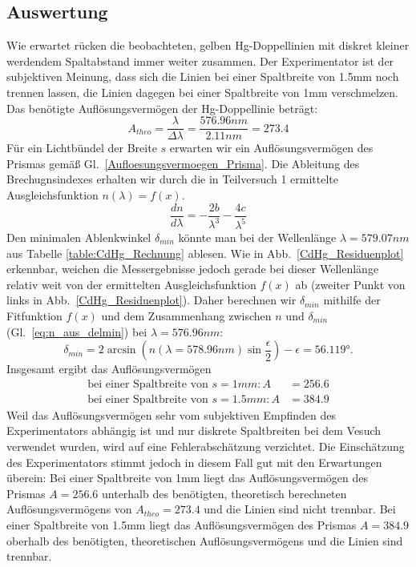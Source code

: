 \documentclass[12pt,a4paper]{article}
\begin{document}
\subsection{Auswertung}
Wie erwartet rücken die beobachteten, gelben Hg-Doppellinien mit diskret kleiner werdendem Spaltabstand immer weiter zusammen. Der Experimentator ist der subjektiven Meinung, dass sich die Linien bei einer Spaltbreite von 1.5mm noch trennen lassen, die Linien dagegen bei einer Spaltbreite von 1mm verschmelzen.\\
Das benötigte Auflösungsvermögen der Hg-Doppellinie beträgt:
\begin{equation}
A_{theo}=\frac{\lambda}{\Delta\lambda}=\frac{576.96nm}{2.11nm}=273.4
\end{equation}
Für ein Lichtbündel der Breite $s$ erwarten wir ein Auflösungsvermögen des Prismas gemäß Gl.~\ref{Aufloesungsvermoegen_Prisma}. Die Ableitung des Brechugnsindexes erhalten wir durch die in Teilversuch 1 ermittelte Ausgleichsfunktion $n(\lambda)=f(x)$. 
\begin{equation}
\frac{dn}{d\lambda}=-\frac{2b}{\lambda^3}-\frac{4c}{\lambda^5}
\end{equation}
Den minimalen Ablenkwinkel $\delta_{min}$ könnte man bei der Wellenlänge $\lambda=579.07nm$ aus Tabelle \ref{table:CdHg_Rechnung} ablesen. Wie in Abb.~\ref{CdHg_Residuenplot} erkennbar, weichen die Messergebnisse jedoch gerade bei dieser Wellenlänge relativ weit von der ermittelten Ausgleichsfunktion $f(x)$ ab (zweiter Punkt von links in Abb.~\ref{CdHg_Residuenplot}). Daher berechnen wir $\delta_{min}$ mithilfe der Fitfunktion $f(x)$ und dem Zusammenhang zwischen $n$ und $\delta_{min}$ (Gl.~\eqref{eq:n_aus_delmin}) bei $\lambda=576.96nm$:
\begin{equation}
\delta_{min}=2\arcsin\left(n(\lambda=578.96nm)\sin{\frac{\epsilon}{2}}\right)-\epsilon=\ang{56.119}.
\end{equation}
Insgesamt ergibt das Auflösungsvermögen
\begin{align}
\text{bei einer Spaltbreite von }s=1mm:A&=256.6\\
\text{bei einer Spaltbreite von }s=1.5mm:A&=384.9
\end{align}
Weil das Auflösungsvermögen sehr vom subjektiven Empfinden des Experimentators abhängig ist und nur diskrete Spaltbreiten bei dem Vesuch verwendet wurden, wird auf eine Fehlerabschätzung verzichtet. Die Einschätzung des Experimentators stimmt jedoch in diesem Fall gut mit den Erwartungen überein: Bei einer Spaltbreite von 1mm liegt das Auflösungsvermögen des Prismas $A=256.6$ unterhalb des benötigten, theoretisch berechneten Auflösungsvermögens von $A_{theo}=273.4$ und die Linien sind nicht trennbar. Bei einer Spaltbreite von 1.5mm liegt das Auflösungsvermögen des Prismas $A=384.9$ oberhalb des benötigten, theoretischen Auflösungsvermögens und die Linien sind trennbar.
\end{document}
